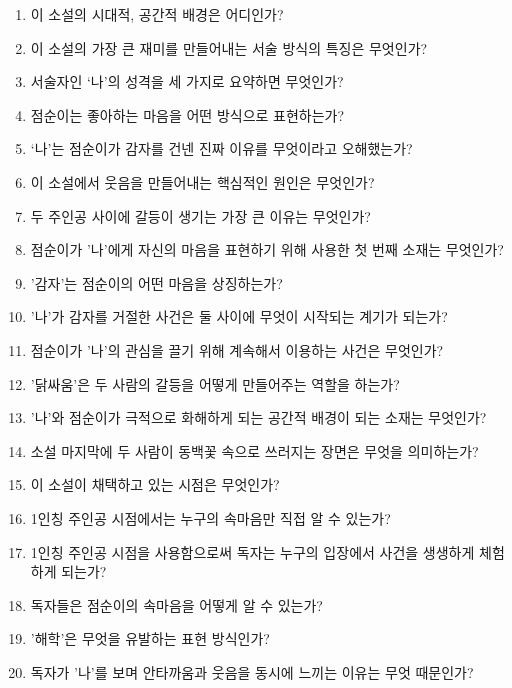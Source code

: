\documentclass[fs9,seriesRus]{korfarm-base}
\begin{document}
\kfActivityBg {}
\par{}\par\nopagebreak[4]\smallskip\nopagebreak[4]
\kfBeginMC
\begin{enumerate}[leftmargin=22pt, itemsep=6pt, topsep=4pt, label=\textbf{\arabic*.}]
\item 이 소설의 시대적, 공간적 배경은 어디인가?
\item 이 소설의 가장 큰 재미를 만들어내는 서술 방식의 특징은 무엇인가?
\item 서술자인 ‘나’의 성격을 세 가지로 요약하면 무엇인가?
\item 점순이는 좋아하는 마음을 어떤 방식으로 표현하는가?
\item ‘나’는 점순이가 감자를 건넨 진짜 이유를 무엇이라고 오해했는가?
\item 이 소설에서 웃음을 만들어내는 핵심적인 원인은 무엇인가?
\item 두 주인공 사이에 갈등이 생기는 가장 큰 이유는 무엇인가?
\item 점순이가 '나'에게 자신의 마음을 표현하기 위해 사용한 첫 번째 소재는 무엇인가?
\item '감자'는 점순이의 어떤 마음을 상징하는가?
\item '나'가 감자를 거절한 사건은 둘 사이에 무엇이 시작되는 계기가 되는가?
\item 점순이가 '나'의 관심을 끌기 위해 계속해서 이용하는 사건은 무엇인가?
\item '닭싸움'은 두 사람의 갈등을 어떻게 만들어주는 역할을 하는가?
\item '나'와 점순이가 극적으로 화해하게 되는 공간적 배경이 되는 소재는 무엇인가?
\item 소설 마지막에 두 사람이 동백꽃 속으로 쓰러지는 장면은 무엇을 의미하는가?
\item 이 소설이 채택하고 있는 시점은 무엇인가?
\item 1인칭 주인공 시점에서는 누구의 속마음만 직접 알 수 있는가?
\item 1인칭 주인공 시점을 사용함으로써 독자는 누구의 입장에서 사건을 생생하게 체험하게 되는가?
\item 독자들은 점순이의 속마음을 어떻게 알 수 있는가?
\item '해학'은 무엇을 유발하는 표현 방식인가?
\item 독자가 '나'를 보며 안타까움과 웃음을 동시에 느끼는 이유는 무엇 때문인가?
\end{enumerate}
\kfEndMC
\end{document}
